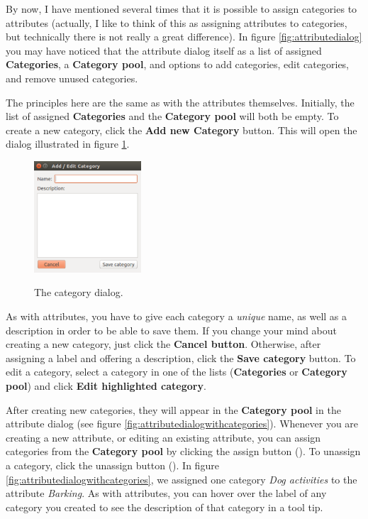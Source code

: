 \documentclass{memoir}
\begin{document}
By now, I have mentioned several times that it is possible to assign categories to attributes (actually, I like to think of this as assigning attributes to categories, but technically there is not really a great difference). In figure \ref{fig:attributedialog} you may have noticed that the attribute dialog itself as a list of assigned \textbf{Categories}, a \textbf{Category pool}, and options to add categories, edit categories, and remove unused categories.

The principles here are the same as with the attributes themselves. Initially, the list of assigned \textbf{Categories} and the \textbf{Category pool} will both be empty. To create a new category, click the \textbf{Add new Category} button. This will open the dialog illustrated in figure \ref{fig:categorydialog}.

\begin{figure}[h!]
  \centering
  \caption{The category dialog.}
  \includegraphics[width=40mm]{Screenshot_11.pdf}
  \label{fig:categorydialog}
\end{figure}

As with attributes, you have to give each category a \emph{unique} name, as well as a description in order to be able to save them. If you change your mind about creating a new category, just click the \textbf{Cancel button}. Otherwise, after assigning a label and offering a description, click the \textbf{Save category} button. To edit a category, select a category in one of the lists (\textbf{Categories} or \textbf{Category pool}) and click \textbf{Edit highlighted category}.

After creating new categories, they will appear in the \textbf{Category pool} in the attribute dialog (see figure \ref{fig:attributedialogwithcategories}). Whenever you are creating a new attribute, or editing an existing attribute, you can assign categories from the \textbf{Category pool} by clicking the assign button (\textbf{\guillemotleft}). To unassign a category, click the unassign button (\textbf{\guillemotright}). In figure \ref{fig:attributedialogwithcategories}, we assigned one category \emph{Dog activities} to the attribute \emph{Barking}. As with attributes, you can hover over the label of any category you created to see the description of that category in a tool tip. 
\end{document}
